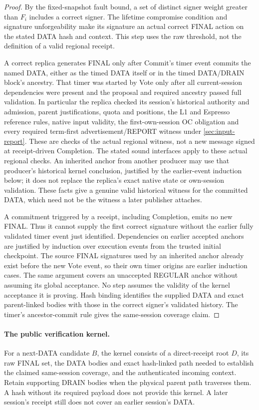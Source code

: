 \begin{proof}
By the fixed-snapshot fault bound, a set of distinct signer weight
greater than $F_i$ includes a correct signer. The lifetime compromise
condition and signature unforgeability make its signature an actual
correct FINAL action on the stated DATA hash and context. This step
uses the raw threshold, not the definition of a valid regional receipt.

A correct replica generates FINAL only after Commit's timer event
commits the named DATA, either as the timed DATA itself or in the timed
DATA/DRAIN block's ancestry. That timer was started by Vote only after
all current-session dependencies were present and the proposal and
required ancestry passed full validation. In particular the replica
checked its session's historical authority and admission, parent
justifications, quota and positions, the L1 and Espresso reference
rules, native input validity, the first-own-session OC obligation and
every required term-first advertisement/REPORT witness under
\cref{sec:input-report}. These are checks of the actual
regional witness, not a new message signed at receipt-driven Completion.
The stated sound interfaces apply to
these actual regional checks. An inherited anchor from another producer
may use that producer's historical kernel conclusion, justified by the
earlier-event induction below; it does not replace the replica's exact
native state or own-session validation. These facts give a genuine valid
historical witness for the committed DATA, which need not be the witness
a later publisher attaches.

A commitment triggered by a receipt, including Completion, emits no
new FINAL. Thus it cannot supply the first correct signature without
the earlier fully validated timer event just identified. Dependencies
on earlier accepted anchors are justified by induction over execution
events from the trusted initial checkpoint. The source FINAL signatures
used by an inherited anchor already exist before the new Vote event,
so their own timer origins are earlier induction cases. The same
argument covers an unaccepted REGULAR anchor without assuming its
global acceptance. No step assumes the validity of the kernel acceptance
it is proving. Hash binding identifies the
supplied DATA and exact parent-linked bodies with those in the correct
signer's validated history. The timer's ancestor-commit rule gives the
same-session coverage claim.
\end{proof}

\paragraph{The public verification kernel.}
For a next-DATA candidate $B$, the kernel consists of a direct-receipt
root $D$, its raw FINAL set, the DATA bodies and exact hash-linked path
needed to establish the claimed same-session coverage, and the
authenticated incoming context. Retain supporting DRAIN bodies when
the physical parent path traverses them. A hash without its required
payload does not provide this kernel. A later session's receipt still
does not cover an earlier session's DATA.

